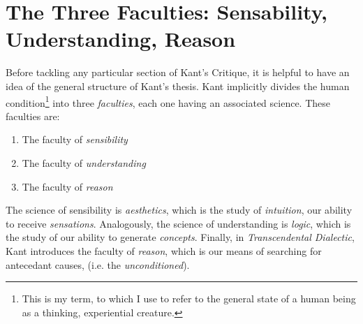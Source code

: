 \section{The Three Faculties: Sensability, Understanding, Reason}
Before tackling any particular section of Kant's Critique, it is helpful to have an idea of the general structure of Kant's thesis. Kant implicitly divides the human condition\footnote{This is my term, to which I use to refer to the general state of a human being as a thinking, experiential creature.} into three \emph{faculties}, each one having an associated science. These faculties are:

\begin{enumerate}
  \item The faculty of \emph{sensibility}
  \item The faculty of \emph{understanding}
  \item The faculty of \emph{reason}
\end{enumerate}

\noindent
The science of sensibility is \emph{aesthetics}, which is the study of \emph{intuition}, our ability to receive \emph{sensations}. Analogously, the science of understanding is \emph{logic}, which is the study of our ability to generate \emph{concepts}. Finally, in \emph{Transcendental Dialectic}, Kant introduces the faculty of \emph{reason}, which is our means of searching for antecedant causes, (i.e. the \emph{unconditioned}).

